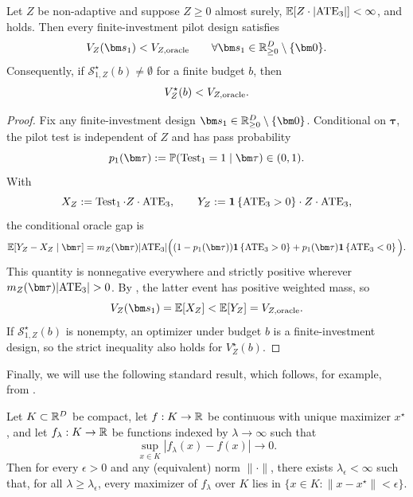 \begin{lemma}
  \label{lem:strict-finite-investment-oracle-gap-weighted}
  Let $Z$ be non-adaptive and suppose $Z\ge0$ almost surely, $\mathbb{E}[Z\cdot|\mathrm{ATE}_3|]<\infty$, and  holds.
  Then every finite-investment pilot design satisfies
  \[
    V_Z(\bm s_1)<V_{Z,\oracle}
    \qquad
    \forall \bm s_1\in\R_{\geq 0}^{D}\setminus\{\bm0\}.
  \]
  Consequently, if $\mathcal S_{1,Z}^\star(b)\neq\emptyset$ for a finite budget $b$, then
  \[
    V_Z^\star(b)<V_{Z,\mathrm{oracle}}.
  \]
\end{lemma}

\begin{proof}
  Fix any finite-investment design $\bm s_1\in\R_{\geq 0}^{D}\setminus\{\bm0\}$.
  Conditional on $\bm\tau$, the pilot test is independent of $Z$ and has pass probability
  \[
    p_1(\bm\tau)
    \defeq
    \P(\Test_1=1\mid\bm\tau)
    \in(0,1).
  \]
  With
  \[
    X_Z:= \operatorname{Test}_1\cdot Z\cdot \mathrm{ATE}_3,
    \qquad
    Y_Z:= \mathbf{1}\left\{\mathrm{ATE}_3>0\right\}\cdot Z\cdot \mathrm{ATE}_3,
  \]
  the conditional oracle gap is
  \[
    \E[Y_Z-X_Z\mid\bm\tau]
    =
    m_Z(\bm\tau)|\ATE_3|
    \Big(
      (1-p_1(\bm\tau))\indic{\ATE_3>0}
      +
      p_1(\bm\tau)\indic{\ATE_3<0}
    \Big).
  \]
  This quantity is nonnegative everywhere and strictly positive wherever $m_Z(\bm\tau)|\ATE_3|>0$.
  By , the latter event has positive weighted mass, so
  \[
    V_Z(\bm s_1)=\E[X_Z]<\E[Y_Z]=V_{Z,\oracle}.
  \]
  If $\mathcal S_{1,Z}^\star(b)$ is nonempty, an optimizer under budget $b$ is a finite-investment design, so the strict inequality also holds for $V_Z^\star(b)$.
\end{proof}

Finally, we will use the following standard result, which follows, for example, from \cite[Prop.~7.15 and Thm.~7.33]{RockafellarWe09}.

\begin{lemma}
  \label{lem:uniform-argmax-transfer-large-budget}
  Let $K\subset \mathbb{R}^D$ be compact, let $f:K\to\mathbb{R}$ be continuous with unique maximizer $x^\star$, and let $f_\lambda:K\to\mathbb{R}$ be functions indexed by $\lambda\to\infty$ such that
  \[
    \sup_{x\in K}|f_\lambda(x)-f(x)|\to0.
  \]
  Then for every $\epsilon>0$ and any (equivalent) norm $\|\cdot\|$, there exists $\lambda_\epsilon<\infty$ such that, for all $\lambda\ge\lambda_\epsilon$, every maximizer of $f_\lambda$ over $K$ lies in $\{x\in K:\|x-x^\star\|<\epsilon\}$.
\end{lemma}

